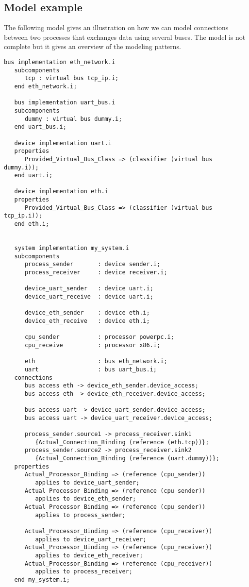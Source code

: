 \documentclass[11pt]{article}
\begin{document}
   \subsection{Model example}
   The following model gives an illustration on how we can model connections
   between two processes that exchanges data using several buses. The model is
   not complete but it gives an overview of the modeling patterns.

   \begin{lstlisting}[language=aadl]
   bus implementation eth_network.i
   subcomponents
      tcp : virtual bus tcp_ip.i;
   end eth_network.i;

   bus implementation uart_bus.i
   subcomponents
      dummy : virtual bus dummy.i;
   end uart_bus.i;

   device implementation uart.i
   properties
      Provided_Virtual_Bus_Class => (classifier (virtual bus dummy.i));
   end uart.i;

   device implementation eth.i
   properties
      Provided_Virtual_Bus_Class => (classifier (virtual bus tcp_ip.i));
   end eth.i;


   system implementation my_system.i
   subcomponents
      process_sender       : device sender.i;
      process_receiver     : device receiver.i;

      device_uart_sender   : device uart.i;
      device_uart_receive  : device uart.i;

      device_eth_sender    : device eth.i;
      device_eth_receive   : device eth.i;

      cpu_sender           : processor powerpc.i;
      cpu_receive          : processor x86.i;

      eth                  : bus eth_network.i;
      uart                 : bus uart_bus.i;
   connections
      bus access eth -> device_eth_sender.device_access;
      bus access eth -> device_eth_receiver.device_access;

      bus access uart -> device_uart_sender.device_access;
      bus access uart -> device_uart_receiver.device_access;

      process_sender.source1 -> process_receiver.sink1
         {Actual_Connection_Binding (reference (eth.tcp))};
      process_sender.source2 -> process_receiver.sink2
         {Actual_Connection_Binding (reference (uart.dummy))};
   properties
      Actual_Processor_Binding => (reference (cpu_sender))
         applies to device_uart_sender;
      Actual_Processor_Binding => (reference (cpu_sender))
         applies to device_eth_sender;
      Actual_Processor_Binding => (reference (cpu_sender))
         applies to process_sender;

      Actual_Processor_Binding => (reference (cpu_receiver))
         applies to device_uart_receiver;
      Actual_Processor_Binding => (reference (cpu_receiver))
         applies to device_eth_receiver;
      Actual_Processor_Binding => (reference (cpu_receiver))
         applies to process_receiver;
   end my_system.i;
   \end{lstlisting}
\end{document}
